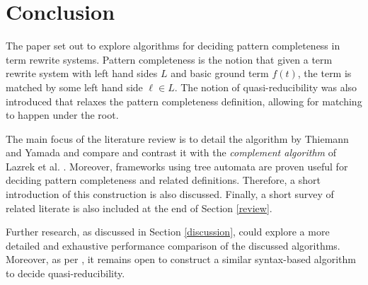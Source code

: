 \section{Conclusion} \label{conclusion}
The paper set out to explore algorithms for deciding pattern completeness in term rewrite systems. Pattern completeness is the notion that given a term rewrite system with left hand sides $L$ and basic ground term $f(t)$, the term is matched by some left hand side $\ell \in L$. The notion of quasi-reducibility was also introduced that relaxes the pattern completeness definition, allowing for matching to happen under the root.

The main focus of the literature review is to detail the algorithm by Thiemann and Yamada\cite{thiemann} and compare and contrast it with the \textit{complement algorithm} of Lazrek et al. \cite{lazrek}. Moreover, frameworks using tree automata are proven useful for deciding pattern completeness and related definitions. Therefore, a short introduction of this construction is also discussed. Finally, a short survey of related literate is also included at the end of Section \ref{review}.

Further research, as discussed in Section \ref{discussion}, could explore a more detailed and exhaustive performance comparison of the discussed algorithms. Moreover, as per \cite{thiemann}, it remains open to construct a similar syntax-based algorithm to decide quasi-reducibility.
